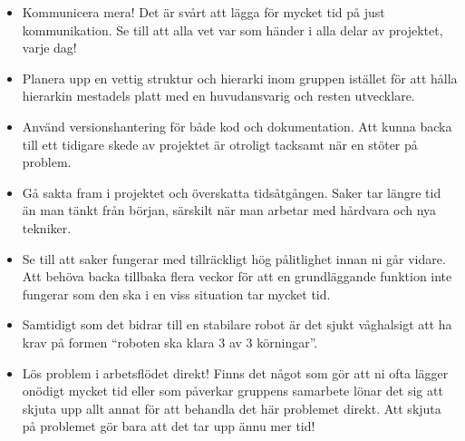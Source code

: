 \documentclass{article}
\begin{document}
\begin{itemize}
    \item Kommunicera mera! Det är svårt att lägga för mycket tid på just kommunikation. Se till att alla vet var som händer i alla delar av projektet, varje dag!
    \item Planera upp en vettig struktur och hierarki inom gruppen istället för att hålla hierarkin mestadels platt med en huvudansvarig och resten utvecklare.
    \item Använd versionshantering för både kod och dokumentation. Att kunna backa till ett tidigare skede av projektet är otroligt tacksamt när en stöter på problem.
    \item Gå sakta fram i projektet och överskatta tidsåtgången. Saker tar längre tid än man tänkt från början, särskilt när man arbetar med hårdvara och nya tekniker.
    \item Se till att saker fungerar med tillräckligt hög pålitlighet innan ni går vidare. Att behöva backa tillbaka flera veckor för att en grundläggande funktion inte fungerar som den ska i en viss situation tar mycket tid.
    \item Samtidigt som det bidrar till en stabilare robot är det sjukt våghalsigt att ha krav på formen ``roboten ska klara 3 av 3 körningar''.
    \item Lös problem i arbetsflödet direkt! Finns det något som gör att ni ofta lägger onödigt mycket tid eller som påverkar gruppens samarbete lönar det sig att skjuta upp allt annat för att behandla det här problemet direkt. Att skjuta på problemet gör bara att det tar upp ännu mer tid!
\end{itemize}

\nocite{*}
{}

\end{document}
